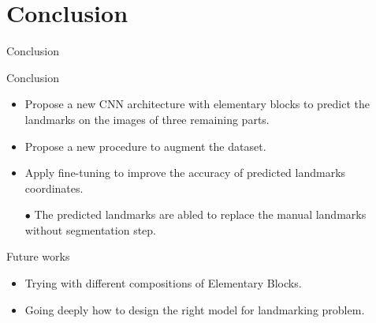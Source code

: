 \documentclass[10pt,svgnames]{beamer}
\begin{document}
\section{Conclusion}
\begin{frame}{Conclusion}
	\begin{block}{Conclusion}
		\small{
			\begin{itemize}
				\item Propose a new CNN architecture with elementary blocks to predict the landmarks on the images of three remaining parts.
				\item Propose a new procedure to augment the dataset.
				\item Apply fine-tuning to improve the accuracy of predicted landmarks coordinates.
				\item[\textcolor{citem}{$\bullet$}] The predicted landmarks are abled to replace the manual landmarks without segmentation step.
			\end{itemize}
		}
	\end{block}
	\pause
	\begin{block}{Future works}
		\small{
			\begin{itemize}
				\item Trying with different compositions of Elementary Blocks.
				\item Going deeply how to design the right model for landmarking problem.
			\end{itemize}					
			}
	\end{block}
\end{frame}

{\1
\begin{frame}
\end{frame}}
\end{document}
